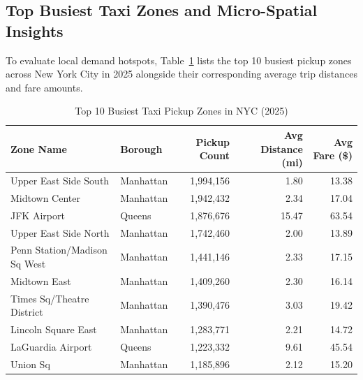 \documentclass[11pt,a4paper]{article}
\begin{document}
\subsection{Top Busiest Taxi Zones and Micro-Spatial Insights}
To evaluate local demand hotspots, Table~\ref{tab:top_10_zones} lists the top 10 busiest pickup zones across New York City in 2025 alongside their corresponding average trip distances and fare amounts.

\begin{table}[htbp]
    \centering
    \caption{Top 10 Busiest Taxi Pickup Zones in NYC (2025)}
    \label{tab:top_10_zones}
    \begin{tabular}{llrrr}
        \toprule
        \textbf{Zone Name} & \textbf{Borough} & \textbf{Pickup Count} & \textbf{Avg Distance (mi)} & \textbf{Avg Fare (\$)} \\
        \midrule
        Upper East Side South & Manhattan & 1,994,156 & 1.80 & 13.38 \\
        Midtown Center & Manhattan & 1,942,432 & 2.34 & 17.04 \\
        JFK Airport & Queens & 1,876,676 & 15.47 & 63.54 \\
        Upper East Side North & Manhattan & 1,742,460 & 2.00 & 13.89 \\
        Penn Station/Madison Sq West & Manhattan & 1,441,146 & 2.33 & 17.15 \\
        Midtown East & Manhattan & 1,409,260 & 2.30 & 16.14 \\
        Times Sq/Theatre District & Manhattan & 1,390,476 & 3.03 & 19.42 \\
        Lincoln Square East & Manhattan & 1,283,771 & 2.21 & 14.72 \\
        LaGuardia Airport & Queens & 1,223,332 & 9.61 & 45.54 \\
        Union Sq & Manhattan & 1,185,896 & 2.12 & 15.20 \\
        \bottomrule
    \end{tabular}
\end{table}
\end{document}
